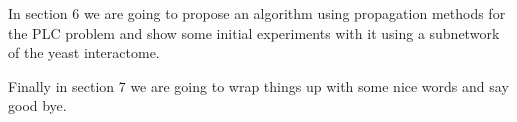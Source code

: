 \documentclass[a4paper,10pt]{article}
\theoremstyle{definition}
\theoremstyle{remark}
\theoremstyle{plain}
\begin{document}
In section 6 we are going to propose an algorithm using propagation methods
for the PLC problem and show some initial experiments with it using a subnetwork
of the yeast interactome.

Finally in section 7 we are going to wrap things up with some nice words and say
good bye.


%
%
%
%
%
\end{document}
